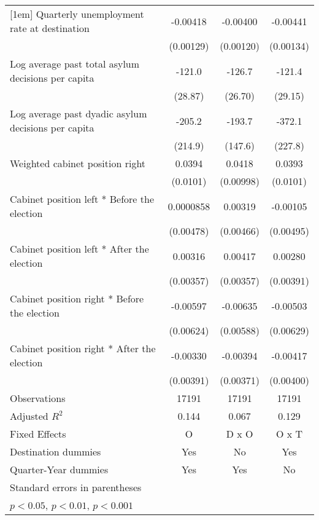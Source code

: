 \begin{table}[htbp]
\begin{tabular}{l*{3}{c}}
[1em]
Quarterly unemployment rate at destination&    -0.00418\sym{**} &    -0.00400\sym{**} &    -0.00441\sym{**} \\
                    &   (0.00129)         &   (0.00120)         &   (0.00134)         \\
[1em]
Log average past total asylum decisions per capita&      -121.0\sym{***}&      -126.7\sym{***}&      -121.4\sym{***}\\
                    &     (28.87)         &     (26.70)         &     (29.15)         \\
[1em]
Log average past dyadic asylum decisions per capita&      -205.2         &      -193.7         &      -372.1         \\
                    &     (214.9)         &     (147.6)         &     (227.8)         \\
[1em]
Weighted cabinet position right&      0.0394\sym{***}&      0.0418\sym{***}&      0.0393\sym{***}\\
                    &    (0.0101)         &   (0.00998)         &    (0.0101)         \\
[1em]
Cabinet position left * Before the election&   0.0000858         &     0.00319         &    -0.00105         \\
                    &   (0.00478)         &   (0.00466)         &   (0.00495)         \\
[1em]
Cabinet position left * After the election&     0.00316         &     0.00417         &     0.00280         \\
                    &   (0.00357)         &   (0.00357)         &   (0.00391)         \\
[1em]
Cabinet position right * Before the election&    -0.00597         &    -0.00635         &    -0.00503         \\
                    &   (0.00624)         &   (0.00588)         &   (0.00629)         \\
[1em]
Cabinet position right * After the election&    -0.00330         &    -0.00394         &    -0.00417         \\
                    &   (0.00391)         &   (0.00371)         &   (0.00400)         \\
\hline
Observations        &       17191         &       17191         &       17191         \\
Adjusted \(R^{2}\)  &       0.144         &       0.067         &       0.129         \\
Fixed Effects       &           O         &       D x O         &       O x T         \\
Destination dummies &         Yes         &          No         &         Yes         \\
Quarter-Year dummies&         Yes         &         Yes         &          No         \\
\hline\hline
\multicolumn{4}{l}{\footnotesize Standard errors in parentheses}\\
\multicolumn{4}{l}{\footnotesize \sym{*} \(p<0.05\), \sym{**} \(p<0.01\), \sym{***} \(p<0.001\)}\\
\end{tabular}
\end{table}
